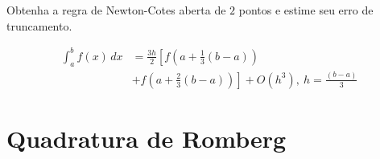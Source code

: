 \begin{exer}\label{exer:NC_aberta_2pts}
  Obtenha a regra de Newton-Cotes aberta de $2$ pontos e estime seu erro de truncamento.
\end{exer}
\begin{resp}
  \begin{align}
    \displaystyle \int_a^bf(x)\,dx &= \frac{3h}{2}\left[f\left(a+\frac{1}{3}(b-a)\right)\right. \\
    &+ \left. f\left(a + \frac{2}{3}(b-a)\right)\right] + O(h^3), ~h=\frac{(b-a)}{3}
  \end{align}
\end{resp}

\section{Quadratura de Romberg}\label{cap_integr_sec_Romberg}

\emconstrucao